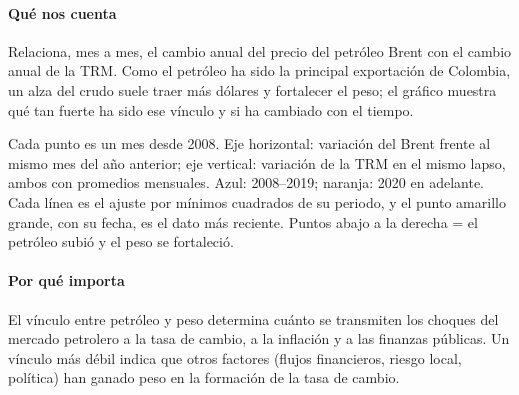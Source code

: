 \paragraph{Qué nos cuenta}
Relaciona, mes a mes, el cambio anual del precio del petróleo Brent con el cambio anual de la TRM. Como el petróleo ha sido la principal exportación de Colombia, un alza del crudo suele traer más dólares y fortalecer el peso; el gráfico muestra qué tan fuerte ha sido ese vínculo y si ha cambiado con el tiempo.

\begin{leer}
Cada punto es un mes desde 2008. Eje horizontal: variación del Brent frente al mismo mes del año anterior; eje vertical: variación de la TRM en el mismo lapso, ambos con promedios mensuales. Azul: 2008–2019; naranja: 2020 en adelante. Cada línea es el ajuste por mínimos cuadrados de su periodo, y el punto amarillo grande, con su fecha, es el dato más reciente. Puntos abajo a la derecha = el petróleo subió y el peso se fortaleció.
\end{leer}

\paragraph{Por qué importa}
El vínculo entre petróleo y peso determina cuánto se transmiten los choques del mercado petrolero a la tasa de cambio, a la inflación y a las finanzas públicas. Un vínculo más débil indica que otros factores (flujos financieros, riesgo local, política) han ganado peso en la formación de la tasa de cambio.

